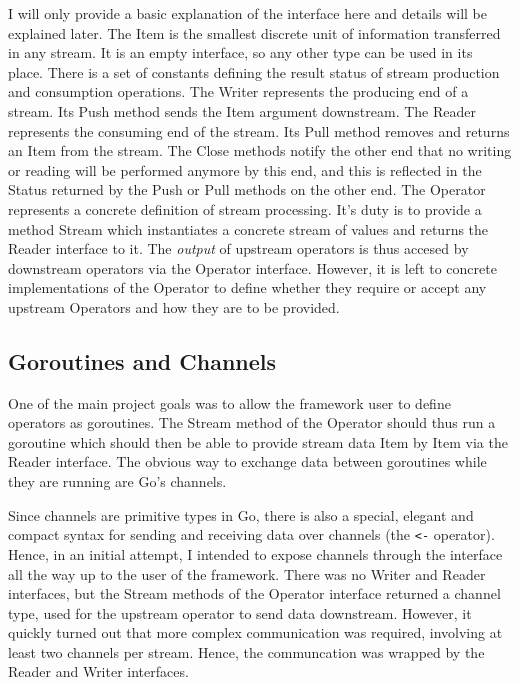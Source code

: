 \documentclass {article}
\begin{document}
I will only provide a basic explanation of the interface here and details will be explained later. The Item is the smallest discrete unit of information transferred in any stream. It is an empty interface, so any other type can be used in its place. There is a set of constants defining the result status of stream production and consumption operations. The Writer represents the producing end of a stream. Its Push method sends the Item argument downstream. The Reader represents the consuming end of the stream. Its Pull method removes and returns an Item from the stream. The Close methods notify the other end that no writing or reading will be performed anymore by this end, and this is reflected in the Status returned by the Push or Pull methods on the other end. The Operator represents a concrete definition of stream processing. It's duty is to provide a method Stream which instantiates a concrete stream of values and returns the Reader interface to it. The \emph{output} of upstream operators is thus accesed by downstream operators via the Operator interface. However, it is left to concrete implementations of the Operator to define whether they require or accept any upstream Operators and how they are to be provided.


\subsection{Goroutines and Channels}

One of the main project goals was to allow the framework user to define operators as goroutines. The Stream method of the Operator should thus run a goroutine which should then be able to provide stream data Item by Item via the Reader interface. The obvious way to exchange data between goroutines while they are running are Go's channels.

Since channels are primitive types in Go, there is also a special, elegant and compact syntax for sending and receiving data over channels (the \lstinline|<-| operator). Hence, in an initial attempt, I intended to expose channels through the interface all the way up to the user of the framework. There was no Writer and Reader interfaces, but the Stream methods of the Operator interface returned a channel type, used for the upstream operator to send data downstream. However, it quickly turned out that more complex communication was required, involving at least two channels per stream. Hence, the communcation was wrapped by the Reader and Writer interfaces.
\end{document}
